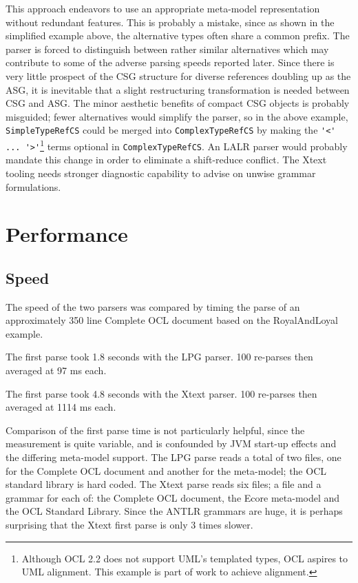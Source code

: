 \documentclass{eceasst}
\begin{document}
This approach endeavors to use an appropriate meta-model representation without redundant features. This is probably a mistake, since as shown in the simplified example above, the alternative types often share a common prefix. The parser is forced to distinguish between rather similar alternatives which may contribute to some of the adverse parsing speeds reported later. Since there is very little prospect of the CSG structure for diverse references doubling up as the ASG, it is inevitable that a slight restructuring transformation is needed between CSG and ASG. The minor aesthetic benefits of compact CSG objects is probably misguided; fewer alternatives would simplify the parser, so in the above example, \verb+SimpleTypeRefCS+ could be merged into \verb+ComplexTypeRefCS+ by making the \verb+'<' ... '>'+\footnote{Although OCL 2.2 does not support UML's templated types, OCL aspires to UML alignment. This  example is part of work to achieve alignment.} terms optional in \verb+ComplexTypeRefCS+. An LALR parser would probably mandate this change in order to eliminate a shift-reduce conflict. The Xtext tooling needs stronger diagnostic capability to advise on unwise grammar formulations. 

\section{Performance}

\subsection{Speed}

The speed of the two parsers was compared by timing the parse of an approximately 350 line Complete OCL document based on the RoyalAndLoyal example.

The first parse took 1.8 seconds with the LPG parser. 100 re-parses then averaged at 97 ms each.

The first parse took 4.8 seconds with the Xtext parser. 100 re-parses then averaged at 1114  ms each.

Comparison of the first parse time is not particularly helpful, since the measurement is quite variable, and is confounded by JVM start-up effects and the differing meta-model support. The LPG parse reads a total of two files, one for the Complete OCL document and another for the meta-model; the OCL standard library is hard coded. The Xtext parse reads six files; a file and a grammar for each of: the Complete OCL document, the Ecore meta-model and the OCL Standard Library. Since the ANTLR grammars are huge, it is perhaps surprising that the Xtext first parse is only 3 times slower.
\end{document}

